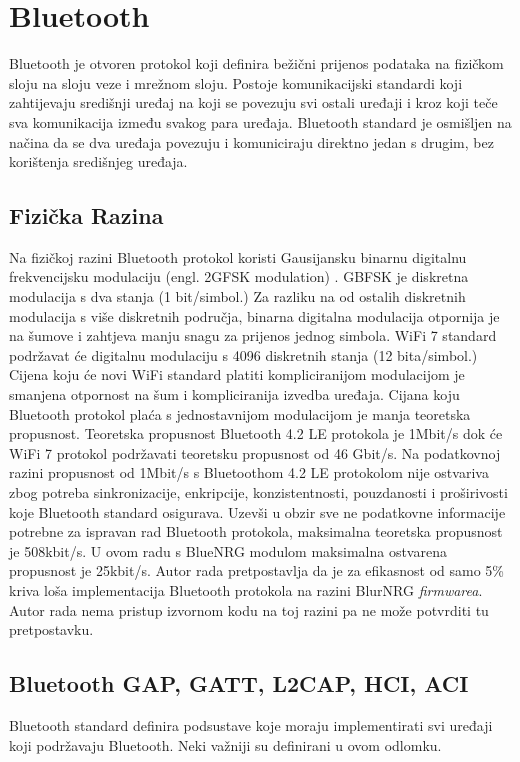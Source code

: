 \documentclass[times, utf8, diplomski]{diplomski}
\begin{document}
\chapter{Bluetooth}

Bluetooth \cite{core41} je otvoren protokol koji definira bežični prijenos podataka na fizičkom sloju na sloju veze i mrežnom sloju.
Postoje komunikacijski standardi koji zahtijevaju središnji uređaj na koji se povezuju svi ostali uređaji i kroz koji teče sva komunikacija između svakog para uređaja.
Bluetooth standard je osmišljen na načina da se dva uređaja povezuju i komuniciraju direktno jedan s drugim, bez korištenja središnjeg uređaja.

\section {Fizička Razina}
Na fizičkoj razini Bluetooth protokol koristi Gausijansku binarnu digitalnu frekvencijsku modulaciju (engl. 2GFSK modulation) \cite{GBFSK}.
GBFSK je diskretna modulacija s dva stanja (1 bit/simbol.)
Za razliku na od ostalih diskretnih modulacija s više diskretnih područja, binarna digitalna modulacija otpornija je na šumove i zahtjeva manju snagu za prijenos jednog simbola.
WiFi 7 standard podržavat će digitalnu modulaciju s 4096 diskretnih stanja \cite{wifimax} (12 bita/simbol.)
Cijena koju će novi WiFi standard platiti kompliciranijom modulacijom je smanjena otpornost na šum i kompliciranija izvedba uređaja.
Cijana koju Bluetooth protokol plaća s jednostavnijom modulacijom je manja teoretska propusnost.
Teoretska propusnost Bluetooth 4.2 LE protokola je 1Mbit/s \cite{maxtrough} dok će WiFi 7 protokol podržavati teoretsku propusnost od 46 Gbit/s.
Na podatkovnoj razini propusnost od 1Mbit/s s Bluetoothom 4.2 LE protokolom nije ostvariva zbog potreba sinkronizacije, enkripcije, konzistentnosti, pouzdanosti i proširivosti koje Bluetooth standard osigurava.
Uzevši u obzir sve ne podatkovne informacije potrebne za ispravan rad Bluetooth protokola, maksimalna teoretska propusnost je 508kbit/s.
U ovom radu s BlueNRG modulom maksimalna ostvarena propusnost je 25kbit/s.
Autor rada pretpostavlja da je za efikasnost od samo 5\% kriva loša implementacija Bluetooth protokola na razini BlurNRG \textit{firmwarea}.
Autor rada nema pristup izvornom kodu na toj razini pa ne može potvrditi tu pretpostavku.

\section{Bluetooth GAP, GATT, L2CAP, HCI, ACI}
Bluetooth standard definira podsustave koje moraju implementirati svi uređaji koji podržavaju Bluetooth. Neki važniji su definirani u ovom odlomku.
\end{document}
